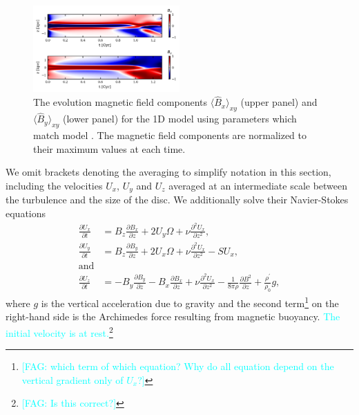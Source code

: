 \documentclass[fleqn,usenatbib]{mnras}
\newcommand{\RSOBSD}{{\sf{O60q0.3}}}
\newcommand{\fg}[1]{\textcolor{cyan}{#1}} %
\newcommand{\fag}[1]{\textcolor{cyan}{[FAG: #1]}} %
\newcommand\deriv[2]{\frac{\partial#1}{\partial#2}}%
\begin{document}
\begin{figure}
    \centering
    \includegraphics[width=0.5\textwidth]{1D_xy_aver.png}
    \caption{The evolution magnetic field components $\langle \widehat{B}_x\rangle_{xy}$ (upper panel) and $\langle \widehat{B}_y\rangle_{xy}$ (lower panel) for the 1D model using parameters which match model {\RSOBSD}. The magnetic field components are normalized to their maximum values at each time.}
    \label{fig:1D_xy}
\end{figure}

{We} omit brackets denoting the averaging to simplify notation in this
section{, including} the velocities $U_x$, $U_y$ and $U_z$ {averaged} at
an intermediate scale between the turbulen{ce} and {the size of the disc}.
We additionally solve {their} Navier-Stokes equations
\begin{align}
    \deriv{U_x}{t} &= B_z\deriv{B_x}{z} + 2U_y\Omega + \nu \frac{\partial^2 U_x}{\partial z^2}\label{1DUx},\\
    \deriv{U_y}{t} &= B_z\deriv{B_y}{z} + 2U_x\Omega + \nu \frac{\partial^2 U_x}{\partial z^2} - SU_x\label{1DUy},\\
    \nonumber
    \text{and}& \\
    \deriv{U_z}{t} &= - B_y\deriv{B_y}{z} - B_x\deriv{B_x}{z} + \nu \frac{\partial^2 U_x}{\partial z^2} - \frac{1}{8\pi\rho}\deriv{B^2}{z} +\frac{\rho^\prime}{\rho_0}g,\label{1DUz}
\end{align}
where $g$ is the vertical acceleration due to gravity and the second
term\footnote{\fag{which term of which equation? Why do all equation depend on
the vertical gradient only of $U_x$?}} on the right-hand side is the Archimedes
force resulting from magnetic buoyancy.  \fg{The initial velocity is at rest.}\footnote{\fag{Is this correct?}}
\end{document}
